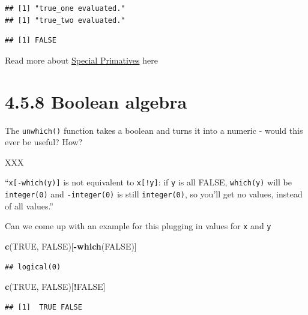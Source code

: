 \documentclass[]{book}
\newenvironment{Shaded}{\begin{snugshade}}{\end{snugshade}}
\newcommand{\KeywordTok}[1]{\textcolor[rgb]{0.13,0.29,0.53}{\textbf{#1}}}
\newcommand{\NormalTok}[1]{#1}
\newcommand{\OperatorTok}[1]{\textcolor[rgb]{0.81,0.36,0.00}{\textbf{#1}}}
\newcommand{\OtherTok}[1]{\textcolor[rgb]{0.56,0.35,0.01}{#1}}
\begin{document}
\begin{verbatim}
## [1] "true_one evaluated."
## [1] "true_two evaluated."
\end{verbatim}

\begin{verbatim}
## [1] FALSE
\end{verbatim}

Read more about \href{https://cran.r-project.org/doc/manuals/r-release/R-ints.html\#Special-primitives}{Special Primatives} here

\hypertarget{boolean-algebra}{%
\section*{4.5.8 Boolean algebra}\label{boolean-algebra}}

The \texttt{unwhich()} function takes a boolean and turns it into a numeric - would this ever be useful? How?

XXX

``\texttt{x{[}-which(y){]}} is not equivalent to \texttt{x{[}!y{]}}: if \texttt{y} is all FALSE, \texttt{which(y)} will be \texttt{integer(0)} and \texttt{-integer(0)} is still \texttt{integer(0)}, so you'll get no values, instead of all values.''

Can we come up with an example for this plugging in values for \texttt{x} and \texttt{y}

\begin{Shaded}
\begin{Highlighting}[]
\KeywordTok{c}\NormalTok{(}\OtherTok{TRUE}\NormalTok{, }\OtherTok{FALSE}\NormalTok{)[}\OperatorTok{-}\KeywordTok{which}\NormalTok{(}\OtherTok{FALSE}\NormalTok{)]}
\end{Highlighting}
\end{Shaded}

\begin{verbatim}
## logical(0)
\end{verbatim}

\begin{Shaded}
\begin{Highlighting}[]
\KeywordTok{c}\NormalTok{(}\OtherTok{TRUE}\NormalTok{, }\OtherTok{FALSE}\NormalTok{)[}\OperatorTok{!}\OtherTok{FALSE}\NormalTok{]}
\end{Highlighting}
\end{Shaded}

\begin{verbatim}
## [1]  TRUE FALSE
\end{verbatim}
\end{document}
